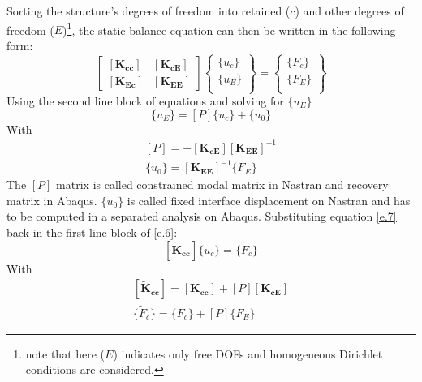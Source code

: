 Sorting the structure's degrees of freedom into retained ($c$) and other degrees of freedom ($E$)\footnote{note that here ($E$) indicates only free DOFs and homogeneous Dirichlet conditions are considered.}, the static balance equation can then be written in the following form:
\begin{equation}
\label{e.6}
\left[ \begin{array}{cc}
\left[ \mathbf{K_{cc}} \right] & \left[ \mathbf{K_{cE}} \right]\\
\left[ \mathbf{K_{Ec}} \right] & \left[ \mathbf{K_{EE}} \right]
\end{array} \right] \left\lbrace \begin{array}{c}
\lbrace u_c \rbrace\\
\lbrace u_E \rbrace\\
\end{array}\right\rbrace =  \left\lbrace \begin{array}{c}
\lbrace F_c \rbrace\\
\lbrace F_E \rbrace\\
\end{array}\right\rbrace
\end{equation}
Using the second line block of equations and solving for $\lbrace u_E \rbrace$
\begin{equation}
\label{e.7}
\lbrace u_E \rbrace =\left[ P \right]\lbrace u_c \rbrace + \lbrace u_0 \rbrace
\end{equation}
With 
\begin{eqnarray}
\left[P\right]=-\left[\mathbf{K_{cE}}\right] \left[ \mathbf{K_{EE}}\right]^{-1} \\
\lbrace u_0 \rbrace=\left[\mathbf{K_{EE}}\right]^{-1}\lbrace F_E \rbrace
\end{eqnarray}
The $\left[P\right]$ matrix is called constrained modal matrix in Nastran and recovery matrix in Abaqus. $\lbrace u_0 \rbrace$ is called fixed interface displacement on Nastran and has to be computed in a separated analysis on Abaqus.
Substituting   equation \ref{e.7} back in the first line block of \ref{e.6}:
\begin{equation}
\label{e.10}
\left[ \mathbf{\tilde{K}_{cc}}\right]\lbrace u_c \rbrace=\lbrace \tilde{F}_c \rbrace 
\end{equation}
With 
\begin{eqnarray}
\left[ \mathbf{\tilde{K}_{cc}}\right]=\left[\mathbf{K_{cc}}\right]+ \left[ P\right]\left[ \mathbf{K_{cE}}\right] \\
\lbrace \tilde{F}_c \rbrace =\lbrace F_c \rbrace + \left[ P\right]\lbrace F_E \rbrace
\end{eqnarray}
